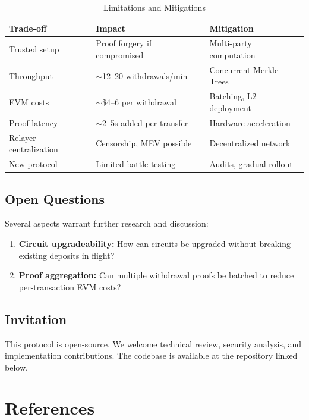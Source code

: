 \documentclass[11pt,a4paper,twoside]{article}
\begin{document}
\begin{table}[H]
\centering
\caption{Limitations and Mitigations}
\label{tab:limitations}
\begin{tabular}{@{}lll@{}}
\toprule
\textbf{Trade-off} & \textbf{Impact} & \textbf{Mitigation} \\
\midrule
Trusted setup & Proof forgery if compromised & Multi-party computation \\
Throughput & $\sim$12--20 withdrawals/min & Concurrent Merkle Trees \\
EVM costs & $\sim$\$4--6 per withdrawal & Batching, L2 deployment \\
Proof latency & $\sim$2--5s added per transfer & Hardware acceleration \\
Relayer centralization & Censorship, MEV possible & Decentralized network \\
New protocol & Limited battle-testing & Audits, gradual rollout \\
\bottomrule
\end{tabular}
\end{table}

\subsection{Open Questions}

Several aspects warrant further research and discussion:
\begin{enumerate}
    \item \textbf{Circuit upgradeability:} How can circuits be upgraded without breaking existing deposits in flight?
    \item \textbf{Proof aggregation:} Can multiple withdrawal proofs be batched to reduce per-transaction EVM costs?
\end{enumerate}

\subsection{Invitation}

This protocol is open-source. We welcome technical review, security analysis, and implementation contributions. The codebase is available at the repository linked below.

\newpage
\section*{References}
\end{document}
